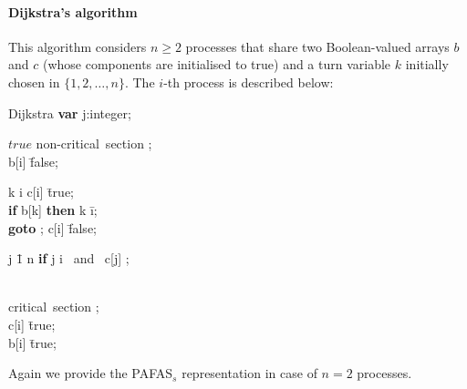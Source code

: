 \documentclass[copyright,creativecommons]{eptcs}
\begin{document}
\paragraph{Dijkstra's algorithm}
This algorithm considers $n \geq 2$ processes that share two Boolean-valued
arrays $b$ and $c$ (whose components are initialised to true) and a turn
variable $k$ initially chosen in $\{1,2,\ldots, n\}$. The $i$-th process is described below:
\begin{algorithm}{Dijkstra}{}
{\bf var} \; j:integer;\\
\begin{WHILE}{$true$}
\langle \mbox{non-critical section} \rangle; \\
b[i] \= false;\\
\begin{IF}{k \neq i}
c[i] \= true;\\
{\bf if} \; b[k] \; {\bf then} \; k \= i; \\
{\bf goto} ;
\ELSE 
c[i] \= false;\\
\begin{FOR}{j \= 1 \TO n}
{\bf if} \; j \neq i  \mbox{ and } \neg c[j]  ;
\end{FOR}
\end{IF}\\
\langle \mbox{critical section} \rangle; \\
c[i] \= true; \\
b[i] \= true;
\end{WHILE}
\end{algorithm}
\noindent Again we provide the PAFAS$_s$ representation in case of $n=2$
processes.
\end{document}
